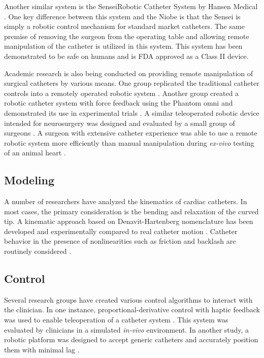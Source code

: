 \documentclass[letterpaper,10pt,conference]{ieeeconf}   %
\begin{document}
Another similar system is the SenseiRobotic Catheter System by Hansen Medical \cite{HansenMedical:Sensei}. One key difference between this system and the Niobe is that the Sensei is simply a robotic control mechanism for standard market catheters. The same premise of removing the surgeon from the operating table and allowing remote manipulation of the catheter is utilized in this system. This system has been demonstrated to be safe on humans \cite{saliba:08a} and is FDA approved as a Class II device. 

Academic research is also being conducted on providing remote manipulation of surgical catheters by various means. One group replicated the traditional catheter controls into a remotely operated robotic system \cite{thakur:09a}. Another group created a robotic catheter system with force feedback using the Phantom omni and demonstrated its use in experimental trials \cite{xiao2012robotic}. A similar teleoperated robotic device intended for neurosurgery was designed and evaluated by a small group of surgeons \cite{srimathveeravalli:10a}. A surgeon with extensive catheter experience was able to use a remote robotic system more efficiently than manual manipulation during \textit{ex-vivo} testing of an animal heart \cite{cercenelli:07a}. 


\subsection{Modeling}
\label{sec:modeling}

A number of researchers have analyzed the kinematics of cardiac catheters. In most cases, the primary consideration is the bending and relaxation of the curved tip. A kinematic approach based on Denavit-Hartenberg nomenclature has been developed and experimentally compared to real catheter motion \cite{ganji:09a}. Catheter behavior in the presence of nonlinearities such as friction and backlash are routinely considered \cite{hasanzadeh:17a}.

\subsection{Control}
\label{sec:Control}

Several research groups have created various control algorithms to interact with the clinician. In one instance, proportional-derivative control with haptic feedback was used to enable teleoperation of a catheter system \cite{srimathveeravalli:10a}. This system was evaluated by clinicians in a simulated \textit{in-vivo} environment. In another study, a robotic platform was designed to accept generic catheters and accurately position them with minimal lag \cite{thakur:09a}. 
\end{document}

